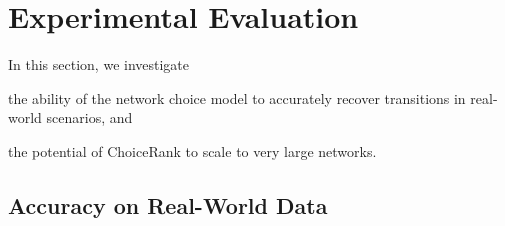 \section{Experimental Evaluation}  %
\label{cr:sec:experiments}

In this section, we investigate
\begin{enuminline}
\item the ability of the network choice model to accurately recover transitions in real-world scenarios, and
\item the potential of ChoiceRank to scale to very large networks.
\end{enuminline}

\subsection{Accuracy on Real-World Data}
\label{cr:sec:accuracy}

